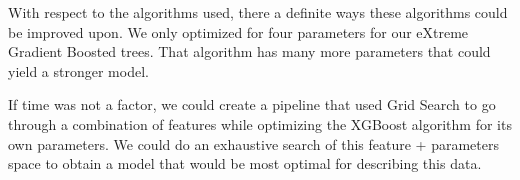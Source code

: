 \documentclass[twoside,openright,titlepage,numbers=noenddot,headinclude,%
               footinclude=true,cleardoublepage=empty,abstractoff,BCOR=5mm,%
               paper=a4,fontsize=11pt,ngerman,american]{scrreprt}
\numberwithin{theorem}{chapter}
\numberwithin{definition}{chapter}
\numberwithin{algorithm}{chapter}
\numberwithin{figure}{chapter}
\numberwithin{table}{chapter}
\numberwithin{equation}{chapter}
\begin{document}
With respect to the algorithms used, there a definite ways these algorithms could be improved upon. We only optimized for four parameters for our eXtreme Gradient Boosted trees. That algorithm has many more parameters that could yield a stronger model.

If time was not a factor, we could create a pipeline that used Grid Search to go through a combination of features while optimizing the XGBoost algorithm for its own parameters. We could do an exhaustive search of this feature + parameters space to obtain a model that would be most optimal for describing this data.



\vspace{4\baselineskip}\vspace{-\parskip} %
\footnotesize %

\end{document}
